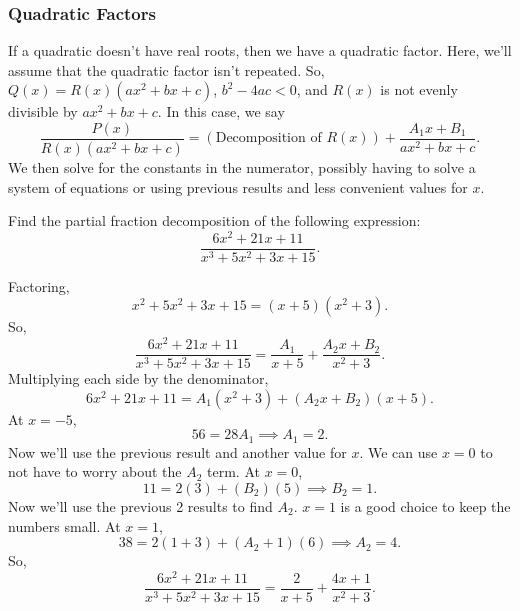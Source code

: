 \subsubsection{Quadratic Factors}
\noindent
If a quadratic doesn't have real roots, then we have a quadratic factor. Here, we'll assume that the quadratic factor isn't repeated. 
So, $Q(x) = R(x)(ax^2+bx+c)$, $b^2-4ac < 0$, and $R(x)$ is not evenly divisible by $ax^2+bx+c$.
In this case, we say
\begin{equation*}
	\frac{P(x)}{R(x)(ax^2+bx+c)} = \left(\text{Decomposition of }R(x)\right)+\frac{A_1x+B_1}{ax^2+bx+c}.
\end{equation*}
We then solve for the constants in the numerator, possibly having to solve a system of equations or using previous results and less convenient values for $x$.

\begin{example}
	Find the partial fraction decomposition of the following expression:
	\begin{equation*}
		\frac{6x^2+21x+11}{x^3+5x^2+3x+15}.
	\end{equation*}
\end{example}
\begin{answer}
	Factoring,
	\begin{equation*}
		x^2+5x^2+3x+15 = (x+5)(x^2+3).
	\end{equation*}
	So,
	\begin{equation*}
		\frac{6x^2+21x+11}{x^3+5x^2+3x+15} = \frac{A_1}{x+5}+\frac{A_2x+B_2}{x^2+3}.
	\end{equation*}
	Multiplying each side by the denominator,
	\begin{equation*}
		6x^2+21x+11 = A_1(x^2+3)+(A_2x+B_2)(x+5).
	\end{equation*}
	At $x=-5$,
	\begin{equation*}
		56 = 28A_1 \implies A_1 = 2.
	\end{equation*}
	Now we'll use the previous result and another value for $x$. We can use $x=0$ to not have to worry about the $A_2$ term.
	At $x=0$,
	\begin{equation*}
		11 = 2(3) + (B_2)(5) \implies B_2 = 1.
	\end{equation*}
	Now we'll use the previous 2 results to find $A_2$. $x=1$ is a good choice to keep the numbers small.
	At $x=1$,
	\begin{equation*}
		38 = 2(1+3)+(A_2+1)(6) \implies A_2 = 4.
	\end{equation*}
	So,
	\begin{equation*}
		\frac{6x^2+21x+11}{x^3+5x^2+3x+15} = \frac{2}{x+5}+\frac{4x+1}{x^2+3}.
	\end{equation*}
\end{answer}
